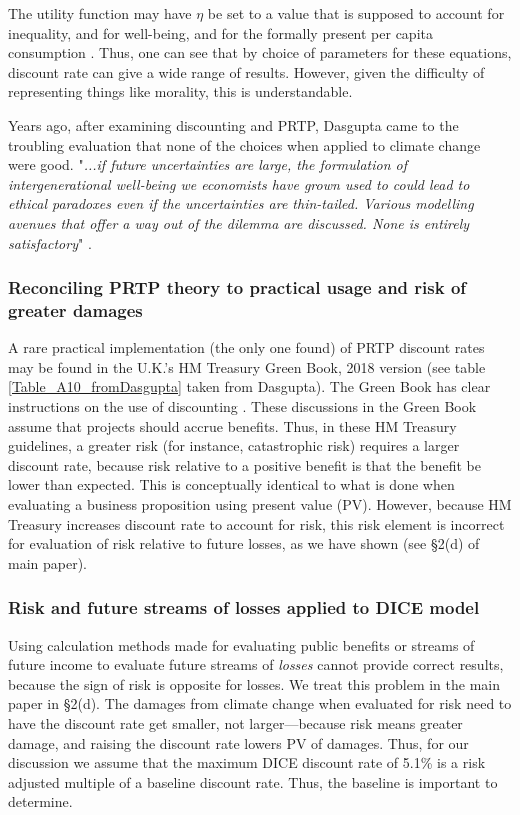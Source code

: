 \documentclass{article}
\begin{document}
The utility function may have $\eta$ be set to a value that is supposed to account for inequality, and for well-being, and for the formally present per capita consumption \cite[p. 445]{Kelleher_2017PRTP(RPTP)}. Thus, one can see that by choice of parameters for these equations, discount rate can give a wide range of results. However, given the difficulty of representing things like morality, this is understandable.

Years ago, after examining discounting and PRTP, Dasgupta came to the troubling evaluation that none of the choices when applied to climate change were good. "\emph{...if future uncertainties are large, the formulation of intergenerational well-being we economists have grown used to could lead to ethical paradoxes even if the uncertainties are thin-tailed. Various modelling avenues that offer a way out of the dilemma are discussed. None is entirely satisfactory}" \cite{Dasgupta2008DiscountngClimate}. 

\subsubsection{Reconciling PRTP theory to practical usage and risk of greater damages}
A rare practical implementation (the only one found) of PRTP discount rates may be found in the U.K.'s HM Treasury Green Book, 2018 version (see table \ref{Table_A10_fromDasgupta} taken from Dasgupta). The Green Book has clear instructions on the use of discounting \cite[pp. 45, 116-119]{HMTreasury2022GreenBook}. These discussions in the Green Book assume that projects should accrue benefits. Thus, in these HM Treasury guidelines, a greater risk (for instance, catastrophic risk) requires a larger discount rate, because risk relative to a positive benefit is that the benefit be lower than  expected. This is conceptually identical to what is done when evaluating a business proposition using present value (PV). However, because HM Treasury increases discount rate to account for risk, this risk element is incorrect for evaluation of risk relative to future losses, as we have shown (see \S2(d) of main paper).

\subsubsection{Risk and future streams of losses applied to DICE model}
\label{Risk_and_future_losses_streams}
Using calculation methods made for evaluating public benefits or streams of future income to evaluate future streams of \emph{losses} cannot provide correct results, because the sign of risk is opposite for losses. We treat this problem in the main paper in \S 2(d). The damages from climate change when evaluated for risk need to have the discount rate get smaller, not larger---because risk means greater damage, and raising the discount rate lowers PV of damages. Thus, for our discussion we assume that the maximum DICE discount rate of 5.1\% \cite{Nordhaus2018ChangesinDICE_Model} is a risk adjusted multiple of a baseline discount rate. Thus, the baseline is important to determine.
\end{document}
